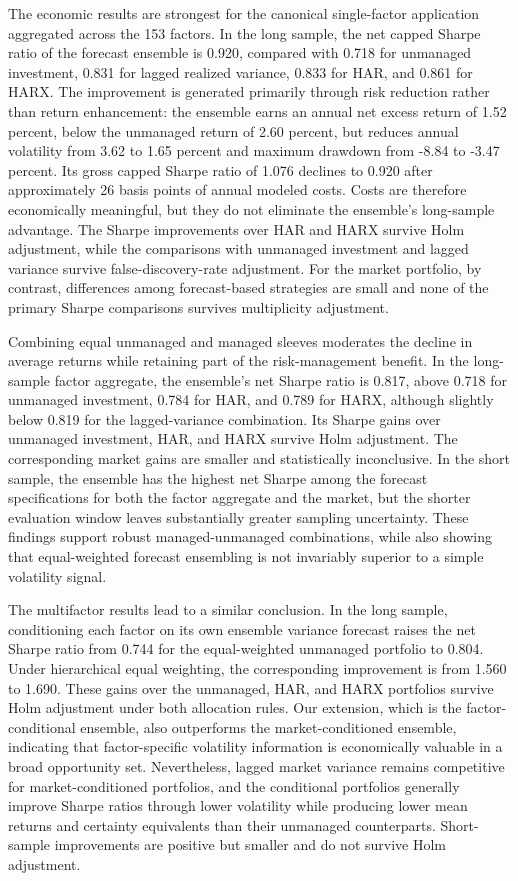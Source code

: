 \documentclass[preprint,12pt,authoryear]{elsarticle}
\begin{document}
The economic results are strongest for the canonical single-factor application aggregated across the 153 factors. In the long sample, the net capped Sharpe ratio of the forecast ensemble is 0.920, compared with 0.718 for unmanaged investment, 0.831 for lagged realized variance, 0.833 for HAR, and 0.861 for HARX. The improvement is generated primarily through risk reduction rather than return enhancement: the ensemble earns an annual net excess return of 1.52 percent, below the unmanaged return of 2.60 percent, but reduces annual volatility from 3.62 to 1.65 percent and maximum drawdown from -8.84 to -3.47 percent. Its gross capped Sharpe ratio of 1.076 declines to 0.920 after approximately 26 basis points of annual modeled costs. Costs are therefore economically meaningful, but they do not eliminate the ensemble's long-sample advantage. The Sharpe improvements over HAR and HARX survive Holm adjustment, while the comparisons with unmanaged investment and lagged variance survive false-discovery-rate adjustment. For the market portfolio, by contrast, differences among forecast-based strategies are small and none of the primary Sharpe comparisons survives multiplicity adjustment.

Combining equal unmanaged and managed sleeves moderates the decline in average returns while retaining part of the risk-management benefit. In the long-sample factor aggregate, the ensemble's net Sharpe ratio is 0.817, above 0.718 for unmanaged investment, 0.784 for HAR, and 0.789 for HARX, although slightly below 0.819 for the lagged-variance combination. Its Sharpe gains over unmanaged investment, HAR, and HARX survive Holm adjustment. The corresponding market gains are smaller and statistically inconclusive. In the short sample, the ensemble has the highest net Sharpe among the forecast specifications for both the factor aggregate and the market, but the shorter evaluation window leaves substantially greater sampling uncertainty. These findings support robust managed-unmanaged combinations, while also showing that equal-weighted forecast ensembling is not invariably superior to a simple volatility signal.

The multifactor results lead to a similar conclusion. In the long sample, conditioning each factor on its own ensemble variance forecast raises the net Sharpe ratio from 0.744 for the equal-weighted unmanaged portfolio to 0.804. Under hierarchical equal weighting, the corresponding improvement is from 1.560 to 1.690. These gains over the unmanaged, HAR, and HARX portfolios survive Holm adjustment under both allocation rules. Our extension, which is the factor-conditional ensemble, also outperforms the market-conditioned ensemble, indicating that factor-specific volatility information is economically valuable in a broad opportunity set. Nevertheless, lagged market variance remains competitive for market-conditioned portfolios, and the conditional portfolios generally improve Sharpe ratios through lower volatility while producing lower mean returns and certainty equivalents than their unmanaged counterparts. Short-sample improvements are positive but smaller and do not survive Holm adjustment.
\end{document}
